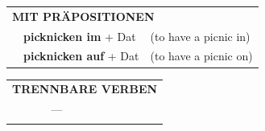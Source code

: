 \documentclass[10pt,a4paper]{revtex4-2}
\begin{document}
\begin{verbbox}
\vspace{10pt}

\begin{tabular}{lll}
\multicolumn{3}{l}{\textbf{MIT PRÄPOSITIONEN}}\\
& \textbf{picknicken im} + Dat & (to have a picnic in)\\
& \textbf{picknicken auf} + Dat & (to have a picnic on)\\
\end{tabular}
\hfill
\begin{tabular}{lll}
\multicolumn{3}{l}{\textbf{TRENNBARE VERBEN}}\\
& ---\\
\vspace{10pt}
\end{tabular}

\vspace{-5pt}
\end{verbbox}
\end{document}
